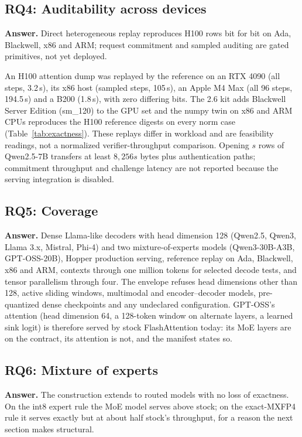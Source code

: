 \documentclass{article}
\begin{document}
\subsection{RQ4: Auditability across devices}

\textbf{Answer.}  Direct heterogeneous replay reproduces H100 rows bit for bit on Ada,
Blackwell, x86 and ARM; request commitment and sampled auditing are gated primitives, not
yet deployed.

An H100 attention dump was replayed by the reference on an RTX 4090 (all steps, 3.2\,s), its
x86 host (sampled steps, 105\,s), an Apple M4 Max (all 96 steps, 194.5\,s) and a B200
(1.8\,s), with zero differing bits.  The 2.6 kit adds Blackwell Server Edition (sm\_120) to
the GPU set and the numpy twin on x86 and ARM CPUs reproduces the H100 reference digests on
every norm case (Table~\ref{tab:exactness}).  These replays differ in workload and are
feasibility readings, not a normalized verifier-throughput comparison.  Opening $s$ rows of
Qwen2.5-7B transfers at least $8{,}256s$ bytes plus authentication paths; commitment
throughput and challenge latency are not reported because the serving integration is
disabled.

\subsection{RQ5: Coverage}

\textbf{Answer.}  Dense Llama-like decoders with head dimension 128 (Qwen2.5, Qwen3, Llama
3.x, Mistral, Phi-4) and two mixture-of-experts models (Qwen3-30B-A3B, GPT-OSS-20B), Hopper
production serving, reference replay on Ada, Blackwell, x86 and ARM, contexts through one
million tokens for selected decode tests, and tensor parallelism through four.  The envelope
refuses head dimensions other than 128, active sliding windows, multimodal and
encoder--decoder models, pre-quantized dense checkpoints and any undeclared configuration.
GPT-OSS's attention (head dimension 64, a 128-token window on alternate layers, a learned
sink logit) is therefore served by stock FlashAttention today: its MoE layers are on the
contract, its attention is not, and the manifest states so.

\subsection{RQ6: Mixture of experts}
\label{sec:eval-moe}

\textbf{Answer.}  The construction extends to routed models with no loss of exactness.  On
the int8 expert rule the MoE model serves above stock; on the exact-MXFP4 rule it serves
exactly but at about half stock's throughput, for a reason the next section makes
structural.
\end{document}
